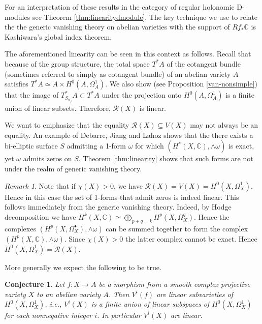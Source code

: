 \documentclass[11pt,reqno]{amsart}
\newtheorem{conjecture}[theorem]{Conjecture}
\theoremstyle{definition}
\theoremstyle{remark}
\newtheorem{remark}[theorem]{Remark}
\theoremstyle{cited}
\theoremstyle{citeddef}
\newcommand{\sR}{\mathcal{R}}
\newcommand{\bbC}{\mathbb{C}}
\begin{document}
For an
interpretation of these results in the category of regular holonomic D-modules
see Theorem \ref{thm:linearitydmodule}. The key technique we
use to relate the the generic vanishing theory on abelian varieties with the support of $Rf_*\bbC$ is Kashiwara's
global index theorem. 

The aforementioned linearity can be seen in this context
as follows. Recall that because of the group structure, the total space $T^*A$ of the cotangent bundle (sometimes referred to simply as cotangent bundle) of an abelian variety $A$ satisfies $T^*A\simeq A\times H^0(A, \Omega_A^1)$. We also show 
(see Proposition \ref{van-nonsimple}) that the image of $T^*_{S_{\alpha_j}}A\subset T^*A$ under the projection onto $H^0(A,\Omega_A^1)$ is a finite union of linear subsets. Therefore, $\sR(X)$
is  linear. 

We want to emphasize that the equality $\sR(X) \subseteq V(X)$ may not always be an equality. An example of Debarre, Jiang and Lahoz 
\cite[Example 1.11]{DJL17} shows that the
there exists a bi-elliptic surface $S$ admitting a 1-form 
$\omega$ for which $(H^*(X, \mathbb{C}), \wedge \omega)$
is exact, yet $\omega$ admits zeros on $S$. Theorem \ref{thm:linearity} shows that such forms are not under the realm of generic vanishing theory. 

\begin{remark}
Note that if $\chi(X)>0$, we have $\sR(X) = V(X) = H^0(X, \Omega_X^1)$. Hence in this case the set of 1-forms that admit zeros is indeed linear. 
This follows immediately from the generic vanishing theory. Indeed, by Hodge decomposition
we have
$H^k(X,\bbC) \simeq \bigoplus_{p+q = k} H^p(X,\Omega_X^q)$. Hence the complexes $(H^p(X, \Omega_X^{\bullet}), \wedge\omega)$ can be summed together to form the complex $(H^p(X, \bbC), \wedge\omega)$. Since $\chi(X)>0$ the latter complex cannot be exact. Hence $H^0(X,\Omega_X^1)
= \sR(X)$.
\end{remark}




More generally we expect the following to be true.
\begin{conjecture} \label{linear-v1}
Let $f: X\to A$ be a morphism from a smooth complex projective variety $X$ to an abelian variety $A$. Then $V^i(f)$ are linear subvarieties of $H^0(X, \Omega_X^1)$, i.e., $V^i(X)$ is a finite union of linear subspaces of $H^0(X, \Omega_X^1)$ for each nonnegative integer $i$. In particular $V^i(X)$ are linear.
\end{conjecture}
\end{document}
